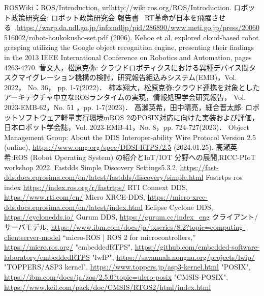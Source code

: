 
\begin{thebibliography}{99}
 ROSWiki：ROS/Introduction, url{http://wiki.ros.org/ROS/Introduction.}
 ロボット政策研究会: ロボット政策研究会 報告書 ~RT革命が日本を飛躍させる~,\url{https://warp.da.ndl.go.jp/info:ndljp/pid/286890/www.meti.go.jp/press/20060516002/robot-houkokusho-set.pdf (2006).}
 Kehoe et al. explored cloud-based robot grasping utilizing the Google object recognition engine, presenting their findings in the 2013 IEEE International Conference on Robotics and Automation, pages 4263-4270.
 菅文人，松原克弥: クラウドロボティクスにおける異種デバイス間タスクマイグレーション機構の検討，研究報告組込みシステム(EMB)，Vol. 2022， No. 36， pp. 1-7(2022)．
 柿本翔大，松原克弥:クラウド連携を対象としたアーキテクチャ中立なROSランタイムの実現，情報処理学会研究報告， Vol. 2023-EMB-62，No. 51 ，pp. 1-7(2023)．
 高瀬英希，田中晴亮，細合晋太郎: ロボットソフトウェア軽量実行環境mROS 2のPOSIX対応に向けた実装および評価，日本ロボット学会誌，Vol. 2023-EMB-41，No. 8，pp. 724-727(2023)．
 Object Management Group: About the DDS Interoper-ability Wire Protocol Version 2.5 (online), \url{https://www.omg.org/spec/DDSI-RTPS/2.5} (2024.01.25).
 高瀬英希:ROS (Robot Operating System) の紹介とIoT/IOT 分野への展開,RICC-PIoT workshop 2022.
 Fastdds Simple Discovery Settings5.3.2, \url{https://fast-dds.docs.eprosima.com/en/latest/fastdds/discovery/simple.html}
 Fastrtps ros index \url{https://index.ros.org/r/fastrtps/}
 RTI Connext DDS, \url{https://www.rti.com/en/}
Micro XRCE-DDS, \url{https://micro-xrce-dds.docs.eprosima.com/en/latest/index.html}
Eclipse Cyclone DDS, \url{https://cyclonedds.io/}
Gurum DDS, \url{https://gurum.cc/index_eng}
クライアント/サーバモデル, \url{https://www.ibm.com/docs/ja/txseries/8.2?topic=computing-clientserver-model}
 “micro-ROS | ROS 2 for microcontrollers,” \url{https://micro.ros.org/} 
 "embeddedRTPS", \url{https://github.com/embedded-software-laboratory/embeddedRTPS}
 "lwIP", \url{https://savannah.nongnu.org/projects/lwip/}
 "TOPPERS/ASP3 kernel", \url{https://www.toppers.jp/asp3-kernel.html}
 "POSIX", \url{https://ibm.com/docs/ja/zos/2.5.0?topic=ulero-posix}
 "CMSIS-POSIX", \url{https://www.keil.com/pack/doc/CMSIS/RTOS2/html/index.html}
\end{thebibliography}